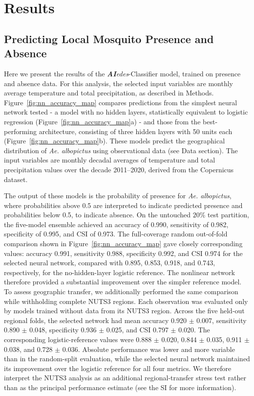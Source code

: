 \documentclass[preprint,12pt]{elsarticle}
\begin{document}
\section{Results}

\subsection{Predicting Local Mosquito Presence and Absence}

Here we present the results of the \textit{\textbf{AI}edes}-Classifier model, trained on presence and absence data. For this analysis, the selected input variables are monthly average temperature and total precipitation, as described in Methods. Figure~\ref{fig:nn_accuracy_map} compares predictions from the simplest neural network tested - a model with no hidden layers, statistically equivalent to logistic regression (Figure~\ref{fig:nn_accuracy_map}a) - and those from the best-performing architecture, consisting of three hidden layers with 50 units each (Figure~\ref{fig:nn_accuracy_map}b). These models predict the geographical distribution of \textit{Ae. albopictus} using observational data (see Data section). The input variables are monthly decadal averages of temperature and total precipitation values over the decade 2011--2020, derived from the Copernicus dataset.


The output of these models is the probability of presence for \textit{Ae. albopictus}, where probabilities above 0.5 are interpreted to indicate predicted presence and probabilities below 0.5, to indicate absence. On the untouched $20\%$ test partition, the five-model ensemble achieved an accuracy of 0.990, sensitivity of 0.982, specificity of 0.995, and CSI of 0.973. The full-coverage random out-of-fold comparison shown in Figure~\ref{fig:nn_accuracy_map} gave closely corresponding values: accuracy 0.991, sensitivity 0.988, specificity 0.992, and CSI 0.974 for the selected neural network, compared with 0.895, 0.853, 0.918, and 0.743, respectively, for the no-hidden-layer logistic reference. The nonlinear network therefore provided a substantial improvement over the simpler reference model.
To assess geographic transfer, we additionally performed the same comparison while withholding complete NUTS3 regions. Each observation was evaluated only by models trained without data from its NUTS3 region. Across the five held-out regional folds, the selected network had mean accuracy 0.920 $\pm$ 0.007, sensitivity 0.890 $\pm$ 0.048, specificity 0.936 $\pm$ 0.025, and CSI 0.797 $\pm$ 0.020. The corresponding logistic-reference values were 0.888 $\pm$ 0.020, 0.844 $\pm$ 0.035, 0.911 $\pm$ 0.038, and 0.728 $\pm$ 0.036. Absolute performance was lower and more variable than in the random-split evaluation, while the selected neural network maintained its improvement over the logistic reference for all four metrics. We therefore interpret the NUTS3 analysis as an additional regional-transfer stress test rather than as the principal performance estimate (see the SI for more information).
\end{document}
